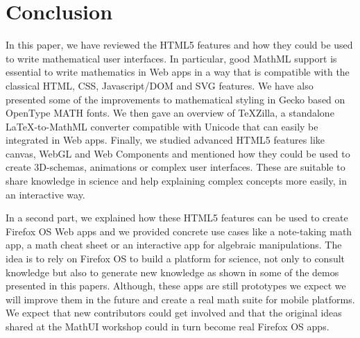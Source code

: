 \section*{Conclusion}

In this paper, we have reviewed the HTML5 features and how they could be used
to write mathematical user interfaces. In particular, good MathML support is
essential to write mathematics in Web apps in a way that is compatible with the
classical HTML, CSS, Javascript/DOM and SVG features. We have also presented
some of the improvements to mathematical styling in Gecko based on OpenType
MATH fonts. We then gave an overview of TeXZilla, a standalone LaTeX-to-MathML
converter compatible with Unicode that can easily be integrated in Web apps.
Finally, we studied advanced HTML5 features like canvas, WebGL and Web
Components and mentioned how they could be used to create 3D-schemas, animations
or complex user interfaces.
These are suitable to share knowledge in science and help
explaining complex concepts more easily, in an interactive way.

In a second part, we explained how these HTML5 features can be used to create
Firefox OS Web apps and we provided concrete use cases like a note-taking math
app, a math cheat sheet or an interactive app for algebraic manipulations.
The idea is to rely on Firefox OS to build a platform for science, not only to
consult knowledge but also to generate new knowledge as shown in some of the
demos presented in this papers. Although, these apps are still prototypes we
expect we will improve them in the future and create a real math suite for
mobile platforms. We expect that new contributors could get involved and that
the original ideas shared at the MathUI workshop could in turn become real
Firefox OS apps.
